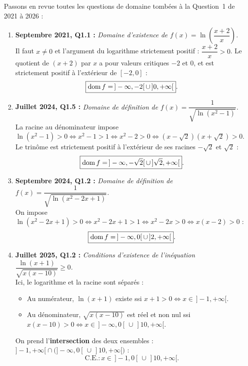 \begin{exemple}
Passons en revue toutes les questions de domaine tombées à la Question~1 de 2021 à 2026 :
\begin{enumerate}
    \item \textbf{Septembre 2021, Q1.1 :} \emph{Domaine d'existence de $f(x) = \ln\left(\dfrac{x + 2}{x}\right)$.}\\
    Il faut $x \neq 0$ et l'argument du logarithme strictement positif : $\dfrac{x + 2}{x} > 0$. Le quotient de $(x+2)$ par $x$ a pour valeurs critiques $-2$ et $0$, et est strictement positif à l'extérieur de $[-2, 0]$ :
    \[
        \boxed{\operatorname{dom} f = \,]-\infty, -2[ \,\cup\, ]0, +\infty[}.
    \]

    \item \textbf{Juillet 2024, Q1.5 :} \emph{Domaine de définition de $f(x) = \dfrac{1}{\sqrt{\ln(x^2 - 1)}}$.}\\
    La racine au dénominateur impose $\ln(x^2 - 1) > 0 \iff x^2 - 1 > 1 \iff x^2 - 2 > 0 \iff (x - \sqrt{2})(x + \sqrt{2}) > 0$. Le trinôme est strictement positif à l'extérieur de ses racines $-\sqrt{2}$ et $\sqrt{2}$ :
    \[
        \boxed{\operatorname{dom} f = \,]-\infty, -\sqrt{2}[ \,\cup\, ]\sqrt{2}, +\infty[}.
    \]

    \item \textbf{Septembre 2024, Q1.2 :} \emph{Domaine de définition de $f(x) = \dfrac{1}{\sqrt{\ln(x^2 - 2x + 1)}}$.}\\
    On impose $\ln(x^2 - 2x + 1) > 0 \iff x^2 - 2x + 1 > 1 \iff x^2 - 2x > 0 \iff x(x - 2) > 0$ :
    \[
        \boxed{\operatorname{dom} f = \,]-\infty, 0[ \,\cup\, ]2, +\infty[}.
    \]

    \item \textbf{Juillet 2025, Q1.2 :} \emph{Conditions d'existence de l'inéquation $\dfrac{\ln(x + 1)}{\sqrt{x(x - 10)}} \ge 0$.}\\
    Ici, le logarithme et la racine sont séparés :
    \begin{itemize}
        \item Au numérateur, $\ln(x + 1)$ existe ssi $x + 1 > 0 \iff x \in \,]-1, +\infty[$.
        \item Au dénominateur, $\sqrt{x(x - 10)}$ est réel et non nul ssi $x(x - 10) > 0 \iff x \in \,]-\infty, 0[ \,\cup\, ]10, +\infty[$.
    \end{itemize}
    On prend l'\textbf{intersection} des deux ensembles : $\bigl]-1, +\infty\bigr[ \cap \bigl(]-\infty, 0[ \,\cup\, ]10, +\infty[\bigr)$ :
    \[
        \boxed{\text{C.E.} : x \in \,]-1, 0[ \,\cup\, ]10, +\infty[}.
    \]


\end{enumerate}
\end{exemple}
